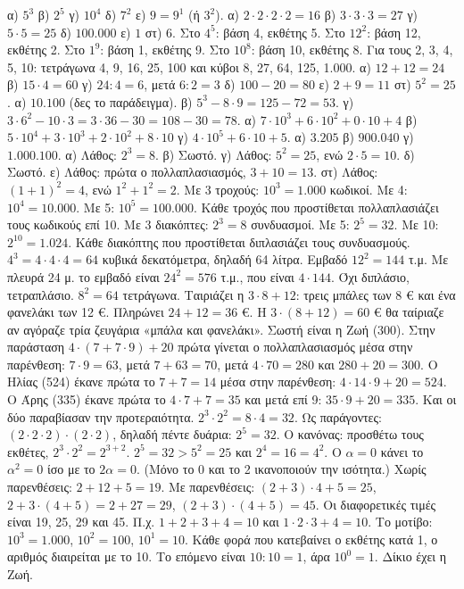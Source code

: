  α) $5^3$ \quad β) $2^5$ \quad γ) $10^4$ \quad δ) $7^2$ \quad ε) $9=9^1$ (ή $3^2$).
 α) $2\cdot 2\cdot 2\cdot 2=16$ \quad β) $3\cdot 3\cdot 3=27$ \quad γ) $5\cdot 5=25$ \quad δ) $100.000$ \quad ε) $1$ \quad στ) $6$.
 Στο $4^5$: βάση 4, εκθέτης 5. Στο $12^2$: βάση 12, εκθέτης 2. Στο $1^9$: βάση 1, εκθέτης 9. Στο $10^8$: βάση 10, εκθέτης 8.
 Για τους 2, 3, 4, 5, 10: τετράγωνα 4, 9, 16, 25, 100 και κύβοι 8, 27, 64, 125, 1.000.
 α) $12+12=24$ \quad β) $15\cdot 4=60$ \quad γ) $24:4=6$, μετά $6:2=3$ \quad δ) $100-20=80$ \quad ε) $2+9=11$ \quad στ) $5^2=25$.
 α) $10.100$ (δες το παράδειγμα). β) $5^3-8\cdot 9=125-72=53$. γ) $3\cdot 6^2-10\cdot 3=3\cdot 36-30=108-30=78$.
 α) $7\cdot 10^3+6\cdot 10^2+0\cdot 10+4$ \quad β) $5\cdot 10^4+3\cdot 10^3+2\cdot 10^2+8\cdot 10$ \quad γ) $4\cdot 10^5+6\cdot 10+5$.
 α) $3.205$ \quad β) $900.040$ \quad γ) $1.000.100$.
 α) Λάθος: $2^3=8$. β) Σωστό. γ) Λάθος: $5^2=25$, ενώ $2\cdot 5=10$. δ) Σωστό. ε) Λάθος: πρώτα ο πολλαπλασιασμός, $3+10=13$. στ) Λάθος: $(1+1)^2=4$, ενώ $1^2+1^2=2$.
 Με 3 τροχούς: $10^3=1.000$ κωδικοί. Με 4: $10^4=10.000$. Με 5: $10^5=100.000$. Κάθε τροχός που προστίθεται πολλαπλασιάζει τους κωδικούς επί 10.
 Με 3 διακόπτες: $2^3=8$ συνδυασμοί. Με 5: $2^5=32$. Με 10: $2^{10}=1.024$. Κάθε διακόπτης που προστίθεται διπλασιάζει τους συνδυασμούς.
 $4^3=4\cdot 4\cdot 4=64$ κυβικά δεκατόμετρα, δηλαδή 64 λίτρα.
 Εμβαδό $12^2=144$ τ.μ. Με πλευρά 24 μ. το εμβαδό είναι $24^2=576$ τ.μ., που είναι $4\cdot 144$. Όχι διπλάσιο, τετραπλάσιο.
 $8^2=64$ τετράγωνα.
 Ταιριάζει η $3\cdot 8+12$: τρεις μπάλες των 8 € και ένα φανελάκι των 12 €. Πληρώνει $24+12=36$ €. Η $3\cdot(8+12)=60$ € θα ταίριαζε αν αγόραζε τρία ζευγάρια «μπάλα και φανελάκι».
 Σωστή είναι η Ζωή (300). Στην παράσταση $4\cdot(7+7\cdot 9)+20$ πρώτα γίνεται ο πολλαπλασιασμός μέσα στην παρένθεση: $7\cdot 9=63$, μετά $7+63=70$, μετά $4\cdot 70=280$ και $280+20=300$. Ο Ηλίας (524) έκανε πρώτα το $7+7=14$ μέσα στην παρένθεση: $4\cdot 14\cdot 9+20=524$. Ο Άρης (335) έκανε πρώτα το $4\cdot 7+7=35$ και μετά επί 9: $35\cdot 9+20=335$. Και οι δύο παραβίασαν την προτεραιότητα.
 $2^3\cdot 2^2=8\cdot 4=32$. Ως παράγοντες: $(2\cdot 2\cdot 2)\cdot(2\cdot 2)$, δηλαδή πέντε δυάρια: $2^5=32$. Ο κανόνας: προσθέτω τους εκθέτες, $2^3\cdot 2^2=2^{3+2}$.
 $2^5=32>5^2=25$ και $2^4=16=4^2$. Ο $\alpha=0$ κάνει το $\alpha^2=0$ ίσο με το $2\alpha=0$. (Μόνο το 0 και το 2 ικανοποιούν την ισότητα.)
 Χωρίς παρενθέσεις: $2+12+5=19$. Με παρενθέσεις: $(2+3)\cdot 4+5=25$, $2+3\cdot(4+5)=2+27=29$, $(2+3)\cdot(4+5)=45$. Οι διαφορετικές τιμές είναι 19, 25, 29 και 45.
 Π.χ. $1+2+3+4=10$ και $1\cdot 2\cdot 3+4=10$.
 Το μοτίβο: $10^3=1.000$, $10^2=100$, $10^1=10$. Κάθε φορά που κατεβαίνει ο εκθέτης κατά 1, ο αριθμός διαιρείται με το 10. Το επόμενο είναι $10:10=1$, άρα $10^0=1$. Δίκιο έχει η Ζωή.
